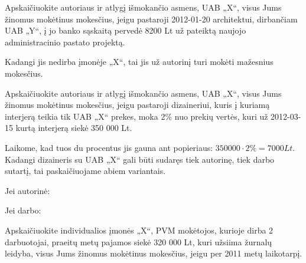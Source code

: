 \begin{tasks}
\begin{task}
\begin{solution}

    \end{solution}
  \end{task}

  \begin{task}
    \begin{condition}
      Apskaičiuokite autoriaus ir atlygį išmokančio asmens, UAB
      „X“, visus Jums žinomus mokėtinus mokesčius, jeigu
      pastaroji 2012-01-20 architektui, dirbančiam UAB „Y“, į jo
      banko sąskaitą pervedė 8200 Lt už pateiktą naujojo
      administracinio pastato projektą.
    \end{condition}
    \begin{solution}
      Kadangi jis nedirba įmonėje „X“, tai jis už autorinį turi mokėti
      mažesnius mokesčius.


    \end{solution}
  \end{task}

  \begin{task}
    \begin{condition}
      Apskaičiuokite autoriaus ir atlygį išmokančio asmens, UAB „X“,
      visus Jums žinomus mokėtinus mokesčius, jeigu pastaroji dizaineriui,
      kuris į kuriamą interjerą teikia tik UAB „X“ prekes, moka 2\%
      nuo prekių vertės, kuri už 2012-03-15 kurtą interjerą siekė
      350 000 Lt.
    \end{condition}
    \begin{solution}
      Laikome, kad tuos du procentus jis gauna ant popieriaus:
      $350 000 \cdot 2\% = 7000 Lt$. Kadangi dizaineris su UAB „X“
      gali būti sudaręs tiek autorinę, tiek darbo sutartį, tai
      paskaičiuojame abiem variantais.

      Jei autorinė:


      Jei darbo:


    \end{solution}
  \end{task}

  \begin{task}
    \begin{condition}
      Apskaičiuokite individualios įmonės „X“, PVM mokėtojos, kurioje dirba
      2 darbuotojai, praeitų metų pajamos siekė 320 000 Lt, kuri
      užsiima žurnalų leidyba, visus Jums žinomus mokėtinus mokesčius,
      jeigu per 2011 metų laikotarpį.
    \end{condition}


\end{task}
\end{tasks}

